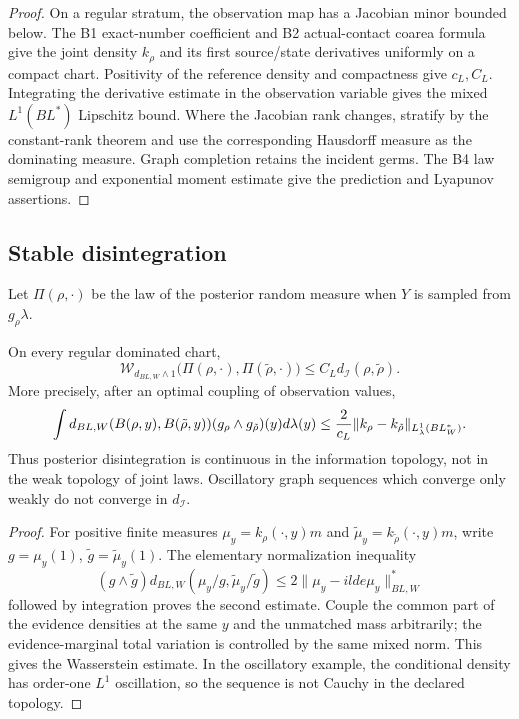 \begin{proof}
On a regular stratum, the observation map has a Jacobian minor bounded below.
The B1 exact-number coefficient and B2 actual-contact coarea formula give the
joint density \(k_\rho\) and its first source/state derivatives uniformly on a
compact chart.  Positivity of the reference density and compactness give
\(c_L,C_L\).  Integrating the derivative estimate in the observation variable
gives the mixed \(L^1(BL^*)\) Lipschitz bound.  Where the Jacobian rank changes,
stratify by the constant-rank theorem and use the corresponding Hausdorff
measure as the dominating measure.  Graph completion retains the incident
germs.  The B4 law semigroup and exponential moment estimate give the
prediction and Lyapunov assertions.
\end{proof}

\subsection{Stable disintegration}

Let \(\Pi(\rho,\cdot)\) be the law of the posterior random measure when
\(Y\) is sampled from \(g_\rho\lambda\).

\begin{theorem}
\label{thm:r16-c1-stability}
On every regular dominated chart,
\[
 \mathcal W_{d_{BL,W}\wedge1}
 \bigl(\Pi(\rho,\cdot),\Pi(\tilde\rho,\cdot)\bigr)
 \le C_L d_{\mathcal I}(\rho,\tilde\rho).
\]
More precisely, after an optimal coupling of observation values,
\[
 \int d_{BL,W}(B(\rho,y),B(\tilde\rho,y))
       (g_\rho\wedge g_{\tilde\rho})(y)d\lambda(y)
 \le {2\over c_L}
 \|k_\rho-k_{\tilde\rho}\|_{L^1_\lambda(BL_W^*)}.
\]
Thus posterior disintegration is continuous in the information topology,
not in the weak topology of joint laws.  Oscillatory graph sequences which
converge only weakly do not converge in \(d_{\mathcal I}\).
\end{theorem}

\begin{proof}
For positive finite measures \(\mu_y=k_\rho(\cdot,y)m\) and
\(\tilde\mu_y=k_{\tilde\rho}(\cdot,y)m\), write
\(g=\mu_y(1)\), \(\tilde g=\tilde\mu_y(1)\).  The elementary normalization
inequality
\[
 (g\wedge\tilde g)
 d_{BL,W}(\mu_y/g,\tilde\mu_y/\tilde g)
 \le2\|\mu_y-	ilde\mu_y\|_{BL,W}^*
\]
followed by integration proves the second estimate.  Couple the common part
of the evidence densities at the same \(y\) and the unmatched mass
arbitrarily; the evidence-marginal total variation is controlled by the same
mixed norm.  This gives the Wasserstein estimate.  In the oscillatory example,
the conditional density has order-one \(L^1\) oscillation, so the sequence is
not Cauchy in the declared topology.
\end{proof}

